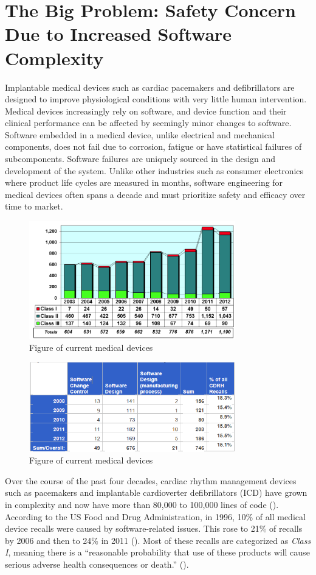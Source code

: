 \section{The Big Problem: Safety Concern Due to Increased Software Complexity}
Implantable medical devices such as cardiac pacemakers and defibrillators are designed to improve physiological conditions with very little human intervention. 
 Medical devices increasingly rely on software, and device function and their clinical performance can be affected by seemingly minor changes to software. Software embedded in a medical device, unlike electrical and mechanical components, does not fail due to corrosion, fatigue or have statistical failures of subcomponents. Software failures are uniquely sourced in the design and development of the system. Unlike other industries such as consumer electronics where product life cycles are measured in months, software engineering for medical devices often spans a decade and must prioritize safety and efficacy over time to market. 
\begin{figure}[t]
		\centering
		\includegraphics[width=0.8\textwidth]{figs/recalls.jpg}
		\caption{\small Figure of current medical devices}
		\label{fig:Cur}
\end{figure}
\begin{figure}[t]
		\centering
		\includegraphics[width=0.8\textwidth]{figs/soft_recalls.jpg}
		\caption{\small Figure of current medical devices}
		\label{fig:Cur}
\end{figure}
  Over the course of the past four decades, cardiac rhythm management devices such as pacemakers and implantable cardioverter defibrillators (ICD) have grown in complexity and now have more than 80,000 to 100,000 lines of code (\cite{pauljones}). According to the US Food and Drug Administration, in 1996, 10\% of all medical device recalls were caused by software-related issues. This rose to 21\% of recalls by 2006 and then to 24\% in 2011 (\cite{medstats}). Most of these recalls are categorized as \emph{Class I}, meaning there is a ``reasonable probability that use of these products will cause serious adverse health consequences or death.'' (\cite{medstats2,pacemakerrecalls,killedbycode}). 
	
